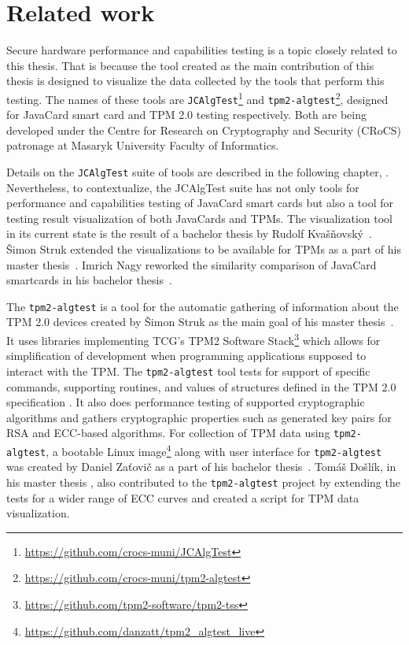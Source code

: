 \section{Related work}
Secure hardware performance and capabilities testing is a topic closely related to this thesis. That is because the tool created as the main contribution of this thesis is designed to visualize the data collected by the tools that perform this testing. The names of these tools are \texttt{JCAlgTest}\footnote{\url{https://github.com/crocs-muni/JCAlgTest}} and \texttt{tpm2-algtest}\footnote{\url{https://github.com/crocs-muni/tpm2-algtest}}, designed for JavaCard smart card and TPM 2.0 testing respectively. Both are being developed under the Centre for Research on Cryptography and Security (CRoCS) patronage at Masaryk University Faculty of Informatics.

Details on the \texttt{JCAlgTest} suite of tools are described in the following chapter, . Nevertheless, to contextualize, the JCAlgTest suite has not only tools for performance and capabilities testing of JavaCard smart cards but also a tool for testing result visualization of both JavaCards and TPMs. The visualization tool in its current state is the result of a bachelor thesis by Rudolf Kvašňovský~\cite{Kvasnovsky2016thesis}. Šimon Struk extended the visualizations to be available for TPMs as a part of his master thesis~\cite{Struk2019thesis}. Imrich Nagy reworked the similarity comparison of JavaCard smartcards in his bachelor thesis~\cite{Nagy2019thesis}.

 The \texttt{tpm2-algtest} is a tool for the automatic gathering of information about the TPM 2.0 devices created by Šimon Struk as the main goal of his master thesis~\cite{Struk2019thesis}. It uses libraries implementing TCG's TPM2 Software Stack\footnote{\url{https://github.com/tpm2-software/tpm2-tss}} which allows for simplification of development when programming applications supposed to interact with the TPM. The \texttt{tpm2-algtest} tool tests for support of specific commands, supporting routines, and values of structures defined in the TPM 2.0 specification \cite{tcg_p3_commands, tcg_p4_supproutines, tcg_p2_structures}. It also does performance testing of supported cryptographic algorithms and gathers cryptographic properties such as generated key pairs for RSA and ECC-based algorithms. For collection of TPM data using \texttt{tpm2-algtest}, a bootable Linux image\footnote{\url{https://github.com/danzatt/tpm2_algtest_live}} along with user interface for \texttt{tpm2-algtest} was created by Daniel Zaťovič as a part of his bachelor thesis~\cite{Zatovic2020thesis}. Tomáš Došlík, in his master thesis \cite{Doslik2021thesis}, also contributed to the \texttt{tpm2-algtest} project by extending the tests for a wider range of ECC curves and created a script for TPM data visualization. 
